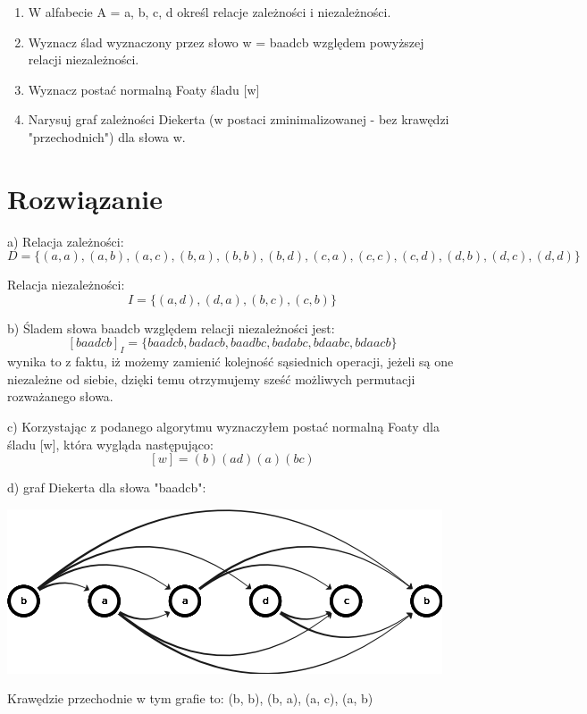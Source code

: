 \documentclass[12pt]{article}
\begin{document}
 
\begin{enumerate}[label=\alph*)]
    \item W alfabecie A = { a, b, c, d} określ relacje zależności i niezależności.
    \item Wyznacz ślad wyznaczony przez słowo w = baadcb względem powyższej relacji niezależności.
    \item Wyznacz postać normalną Foaty śladu [w]
    \item Narysuj graf zależności Diekerta (w postaci zminimalizowanej - bez krawędzi "przechodnich") dla słowa w.
\end{enumerate} 

\section{Rozwiązanie}
\noindent
a) Relacja zależności:
\[ D = \{(a, a),(a, b),(a, c),(b, a),(b, b),(b, d),(c, a),(c, c),(c, d),(d, b),(d, c),(d, d)\}  \]

Relacja niezależności:
\[ I = \{(a, d),(d, a),(b, c),(c, b)\}  \]

\vspace{0.4cm}
\noindent
b) Śladem słowa baadcb względem relacji niezależności jest:
\[ [baadcb]_I = \{ baadcb, badacb, baadbc, badabc, bdaabc, bdaacb \} \]
\noindent
wynika to z faktu, iż możemy zamienić kolejność sąsiednich operacji, jeżeli są one niezależne od siebie, dzięki temu otrzymujemy sześć możliwych permutacji rozważanego słowa.

\newpage
\noindent
c) Korzystając z podanego algorytmu wyznaczyłem postać normalną Foaty dla śladu [w], która wygląda następująco:
\[  [w] = (b)(ad)(a)(bc)  \]

\vspace{0.4cm}
\noindent
d) graf Diekerta dla słowa "baadcb":
\begin{center}
\centering
    \includegraphics{graph1.png}
\end{center}

\noindent
Krawędzie przechodnie w tym grafie to: (b, b), (b, a), (a, c), (a, b)
\end{document}
